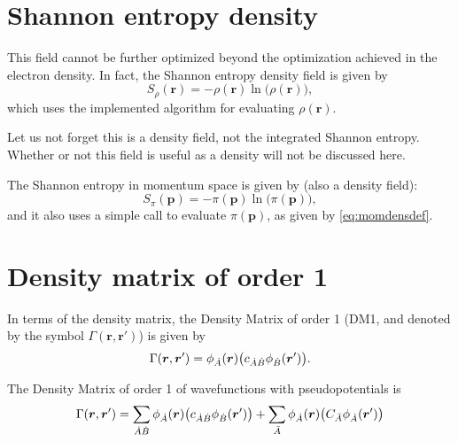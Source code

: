 \section{Shannon entropy density}

This field cannot be further optimized beyond the optimization achieved in the electron density. In fact, the Shannon entropy density field is given by
%
\begin{equation}
   S_{\rho}(\boldsymbol{r})=-\rho(\boldsymbol{r})\ln\big(\rho(\boldsymbol{r})\big),
\end{equation}
%
which uses the implemented algorithm for evaluating $\rho(\boldsymbol{r})$.

Let us not forget this is a density field, not the integrated Shannon entropy. Whether or not this field is useful as a density will not be discussed here.

The Shannon entropy in momentum space is given by (also a density field):
%
\begin{equation}
   S_{\pi}(\boldsymbol{p})=-\pi(\boldsymbol{p})\ln\big(\pi(\boldsymbol{p})\big),
\end{equation}
%
and it also uses a simple call to evaluate $\pi(\boldsymbol{p})$, as given by \ref{eq:momdensdef}.


\section{Density matrix of order 1}

In terms of the density matrix, the Density Matrix of order 1 (DM1, and denoted by the symbol $\Gamma(\boldsymbol{r},\boldsymbol{r}')$) is given by
%
\begin{equation}
   \Gamma(\boldsymbol{r},\boldsymbol{r}')=\phi_{\dot{A}}(\boldsymbol{r})\big(c_{\dot{A}\dot{B}}\phi_{\dot{B}}(\boldsymbol{r}')\big).
\end{equation}
%

The Density Matrix of order 1 of wavefunctions with pseudopotentials is
%
\begin{equation}%
  \Gamma(\boldsymbol{r},\boldsymbol{r}')=\sum_{\dA\dB}
  \phi_{\dA}(\boldsymbol{r})\big(c_{\dA\dB}\phi_{\dB}(\boldsymbol{r}')\big)
  +\sum_{\bA}
  \phi_{\dA}(\boldsymbol{r})\big(C_{\bA}\phi_{\dA}(\boldsymbol{r}')\big)
\end{equation}
%


